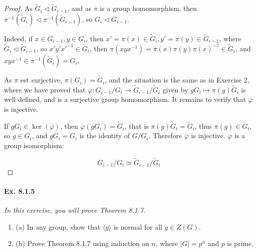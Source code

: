 \documentclass[11pt,a4paper]{article}
\newcommand{\be} {\begin{enumerate}}
\newcommand{\ee} {\end{enumerate}}
\begin{document}
\begin{proof}
As $\tilde{G}_i \lhd \tilde{G}_{i-1}$, and as $\pi$ is a group homomorphism, then  $\pi^{-1} (\tilde{G}_i) \lhd \pi^{-1} (\tilde{G}_{i-1})$, so $G_{i} \lhd G_{i-1}$.

Indeed, if $x \in G_{i-1}, y \in G_{i}$, then $x' = \pi(x) \in \tilde{G}_i,y' =\pi(y) \in \tilde{G}_{i-1}$, where $\tilde{G}_i \lhd \tilde{G}_{i-1}$, so $x' y' x'^{-1} \in \tilde{G}_i$, 
then $\pi(xyx^{-1}) = \pi(x) \pi(y) \pi(x)^{-1} \in \tilde{G}_{i}$, and $xyx^{-1} \in \pi^{-1}(\tilde{G}_i) = G_i$.


As $\pi$ est surjective, $\pi(G_i) = \tilde{G}_i$, and the situation is the same as in Exercise 2, where we have proved that $\overline{\varphi} : G_{i-1}/G_{i} \to \tilde G_{i-1}/ \tilde G_{i}$ given by $gG_i \mapsto \pi(g) \tilde{G}_i$ is well defined, and is a surjective group homomorphism. It remains to verify that $\overline{\varphi}$ is injective.

If $g G_i \in \ker(\overline{\varphi})$, then $\overline{\varphi}(gG_i) = \tilde G_i$, that is $\pi(g) \tilde G_i = \tilde G_i$, thus $\pi(g) \in \tilde G_i$, so  $g \in G_i$, and $gG_i =G_i$ is the identity of $G/G_i$. Therefore $\overline{\varphi}$ is injective. $\overline{\varphi}$ is a group isomorphism:

$$ G_{i-1}/G_{i} \simeq \tilde G_{i-1}/ \tilde G_{i}$$
\end{proof}

\paragraph{Ex. 8.1.5}

{\it In this exercise, you will prove Theorem 8.1.7.
\be
\item[(a)] In any group, show that $\langle g \rangle$ is normal for all $g \in Z(G)$.
\item[(b)] Prove Theorem 8.1.7 using induction on $n$, where $|G| = p^n$ and $p$ is prime.
\ee
}
\end{document}
